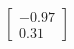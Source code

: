 \documentclass[preview]{standalone}
\begin{document}
\begin{align*}
\begin{bmatrix} -0.97 \\ 0.31 \end{bmatrix}
\end{align*}
\end{document}
